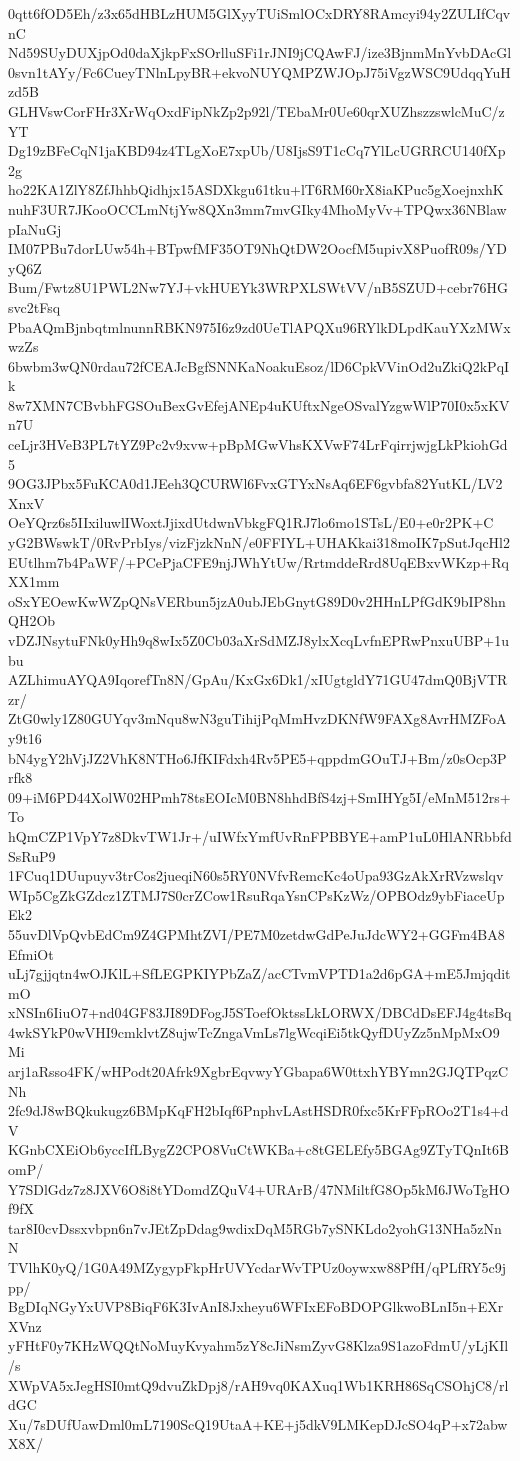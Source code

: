 0qtt6fOD5Eh/z3x65dHBLzHUM5GlXyyTUiSmlOCxDRY8RAmcyi94y2ZULIfCqvnC
Nd59SUyDUXjpOd0daXjkpFxSOrlluSFi1rJNI9jCQAwFJ/ize3BjnmMnYvbDAcGl
0svn1tAYy/Fc6CueyTNlnLpyBR+ekvoNUYQMPZWJOpJ75iVgzWSC9UdqqYuHzd5B
GLHVswCorFHr3XrWqOxdFipNkZp2p92l/TEbaMr0Ue60qrXUZhszzswlcMuC/zYT
Dg19zBFeCqN1jaKBD94z4TLgXoE7xpUb/U8IjsS9T1cCq7YlLcUGRRCU140fXp2g
ho22KA1ZlY8ZfJhhbQidhjx15ASDXkgu61tku+lT6RM60rX8iaKPuc5gXoejnxhK
nuhF3UR7JKooOCCLmNtjYw8QXn3mm7mvGIky4MhoMyVv+TPQwx36NBlawpIaNuGj
IM07PBu7dorLUw54h+BTpwfMF35OT9NhQtDW2OocfM5upivX8PuofR09s/YDyQ6Z
Bum/Fwtz8U1PWL2Nw7YJ+vkHUEYk3WRPXLSWtVV/nB5SZUD+cebr76HGsvc2tFsq
PbaAQmBjnbqtmlnunnRBKN975I6z9zd0UeTlAPQXu96RYlkDLpdKauYXzMWxwzZs
6bwbm3wQN0rdau72fCEAJcBgfSNNKaNoakuEsoz/lD6CpkVVinOd2uZkiQ2kPqIk
8w7XMN7CBvbhFGSOuBexGvEfejANEp4uKUftxNgeOSvalYzgwWlP70I0x5xKVn7U
ceLjr3HVeB3PL7tYZ9Pc2v9xvw+pBpMGwVhsKXVwF74LrFqirrjwjgLkPkiohGd5
9OG3JPbx5FuKCA0d1JEeh3QCURWl6FvxGTYxNsAq6EF6gvbfa82YutKL/LV2XnxV
OeYQrz6s5IIxiluwlIWoxtJjixdUtdwnVbkgFQ1RJ7lo6mo1STsL/E0+e0r2PK+C
yG2BWswkT/0RvPrbIys/vizFjzkNnN/e0FFIYL+UHAKkai318moIK7pSutJqcHl2
EUtlhm7b4PaWF/+PCePjaCFE9njJWhYtUw/RrtmddeRrd8UqEBxvWKzp+RqXX1mm
oSxYEOewKwWZpQNsVERbun5jzA0ubJEbGnytG89D0v2HHnLPfGdK9bIP8hnQH2Ob
vDZJNsytuFNk0yHh9q8wIx5Z0Cb03aXrSdMZJ8ylxXcqLvfnEPRwPnxuUBP+1ubu
AZLhimuAYQA9IqorefTn8N/GpAu/KxGx6Dk1/xIUgtgldY71GU47dmQ0BjVTRzr/
ZtG0wly1Z80GUYqv3mNqu8wN3guTihijPqMmHvzDKNfW9FAXg8AvrHMZFoAy9t16
bN4ygY2hVjJZ2VhK8NTHo6JfKIFdxh4Rv5PE5+qppdmGOuTJ+Bm/z0sOcp3Prfk8
09+iM6PD44XolW02HPmh78tsEOIcM0BN8hhdBfS4zj+SmIHYg5I/eMnM512rs+To
hQmCZP1VpY7z8DkvTW1Jr+/uIWfxYmfUvRnFPBBYE+amP1uL0HlANRbbfdSsRuP9
1FCuq1DUupuyv3trCos2jueqiN60s5RY0NVfvRemcKc4oUpa93GzAkXrRVzwslqv
WIp5CgZkGZdcz1ZTMJ7S0crZCow1RsuRqaYsnCPsKzWz/OPBOdz9ybFiaceUpEk2
55uvDlVpQvbEdCm9Z4GPMhtZVI/PE7M0zetdwGdPeJuJdcWY2+GGFm4BA8EfmiOt
uLj7gjjqtn4wOJKlL+SfLEGPKIYPbZaZ/acCTvmVPTD1a2d6pGA+mE5JmjqditmO
xNSIn6IiuO7+nd04GF83JI89DFogJ5SToefOktssLkLORWX/DBCdDsEFJ4g4tsBq
4wkSYkP0wVHI9cmklvtZ8ujwTcZngaVmLs7lgWcqiEi5tkQyfDUyZz5nMpMxO9Mi
arj1aRsso4FK/wHPodt20Afrk9XgbrEqvwyYGbapa6W0ttxhYBYmn2GJQTPqzCNh
2fc9dJ8wBQkukugz6BMpKqFH2bIqf6PnphvLAstHSDR0fxc5KrFFpROo2T1s4+dV
KGnbCXEiOb6yccIfLBygZ2CPO8VuCtWKBa+c8tGELEfy5BGAg9ZTyTQnIt6BomP/
Y7SDlGdz7z8JXV6O8i8tYDomdZQuV4+URArB/47NMiltfG8Op5kM6JWoTgHOf9fX
tar8I0cvDssxvbpn6n7vJEtZpDdag9wdixDqM5RGb7ySNKLdo2yohG13NHa5zNnN
TVlhK0yQ/1G0A49MZygypFkpHrUVYcdarWvTPUz0oywxw88PfH/qPLfRY5c9jpp/
BgDIqNGyYxUVP8BiqF6K3IvAnI8Jxheyu6WFIxEFoBDOPGlkwoBLnI5n+EXrXVnz
yFHtF0y7KHzWQQtNoMuyKvyahm5zY8cJiNsmZyvG8Klza9S1azoFdmU/yLjKIl/s
XWpVA5xJegHSI0mtQ9dvuZkDpj8/rAH9vq0KAXuq1Wb1KRH86SqCSOhjC8/rldGC
Xu/7sDUfUawDml0mL7190ScQ19UtaA+KE+j5dkV9LMKepDJcSO4qP+x72abwX8X/
